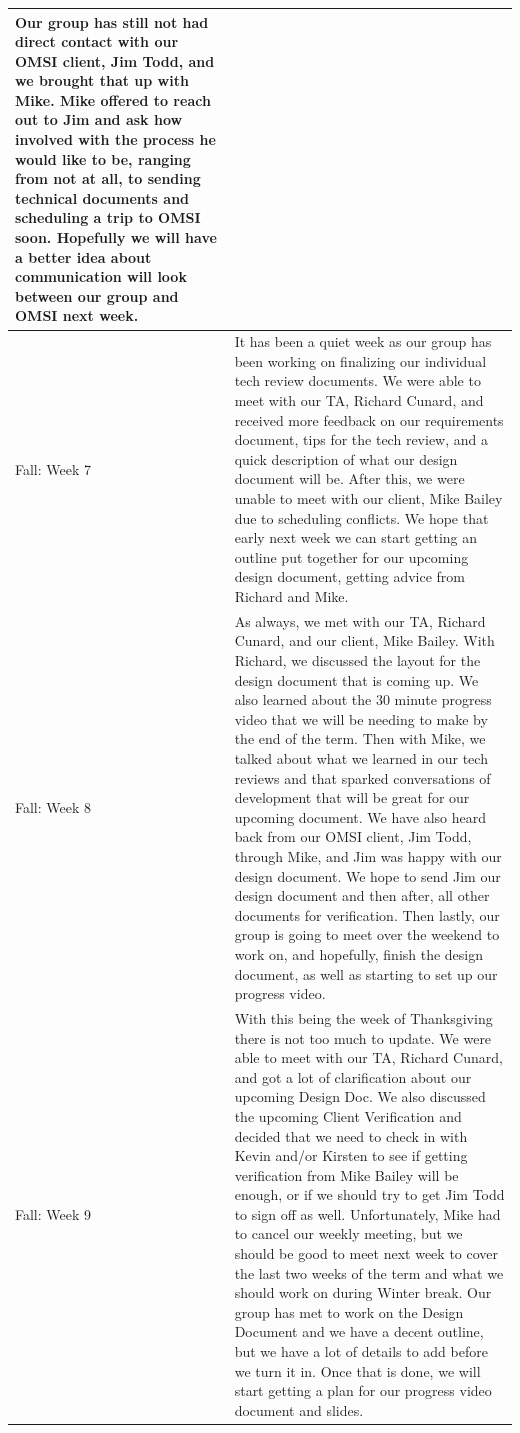 \documentclass[onecolumn, draftclsnofoot,10pt, compsoc]{IEEEtran}
\begin{document}
\begin{longtable} {|p{1.5cm}|p{13.5cm}|}
Our group has still not had direct contact with our OMSI client, Jim Todd, and we brought that up with Mike. Mike offered to reach out to Jim and ask how involved with the process he would like to be, ranging from not at all, to sending technical documents and scheduling a trip to OMSI soon. Hopefully we will have a better idea about communication will look between our group and OMSI next week. \\ \hline

Fall: Week 7 & 
It has been a quiet week as our group has been working on finalizing our individual tech review documents. We were able to meet with our TA, Richard Cunard, and received more feedback on our requirements document, tips for the tech review, and a quick description of what our design document will be. After this, we were unable to meet with our client, Mike Bailey due to scheduling conflicts. We hope that early next week we can start getting an outline put together for our upcoming design document, getting advice from Richard and Mike. \\ \hline

Fall: Week 8 & 
As always, we met with our TA, Richard Cunard, and our client, Mike Bailey. With Richard, we discussed the layout for the design document that is coming up. We also learned about the 30 minute progress video that we will be needing to make by the end of the term. Then with Mike, we talked about what we learned in our tech reviews and that sparked conversations of development that will be great for our upcoming document. We have also heard back from our OMSI client, Jim Todd, through Mike, and Jim was happy with our design document. We hope to send Jim our design document and then after, all other documents for verification. Then lastly, our group is going to meet over the weekend to work on, and hopefully, finish the design document, as well as starting to set up our progress video. \\ \hline

Fall: Week 9 & 
With this being the week of Thanksgiving there is not too much to update. We were able to meet with our TA, Richard Cunard, and got a lot of clarification about our upcoming Design Doc. We also discussed the upcoming Client Verification and decided that we need to check in with Kevin and/or Kirsten to see if getting verification from Mike Bailey will be enough, or if we should try to get Jim Todd to sign off as well. Unfortunately, Mike had to cancel our weekly meeting, but we should be good to meet next week to cover the last two weeks of the term and what we should work on during Winter break. Our group has met to work on the Design Document and we have a decent outline, but we have a lot of details to add before we turn it in. Once that is done, we will start getting a plan for our progress video document and slides. \\ \hline


\end{longtable}
\end{document}
